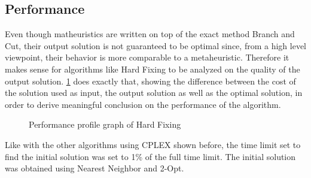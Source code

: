 \subsection{Performance}

Even though matheuristics are written on top of the exact method Branch and Cut, their output solution is not guaranteed to be optimal since, from a high level viewpoint, their behavior is more comparable to a metaheuristic.
Therefore it makes sense for algorithms like Hard Fixing to be analyzed on the quality of the output solution.
\figurename{ \ref{fig:hardfixCost}} does exactly that, showing the difference between the cost of the solution used as input, the output solution as well as the optimal solution, in order to derive meaningful conclusion on the performance of the algorithm.
\begin{figure}[htbp]
	\centering
	\caption{Performance profile graph of Hard Fixing\label{fig:hardfixCost}}
\end{figure}
Like with the other algorithms using CPLEX shown before, the time limit set to find the initial solution was set to 1\% of the full time limit.
The initial solution was obtained using Nearest Neighbor and 2-Opt.
